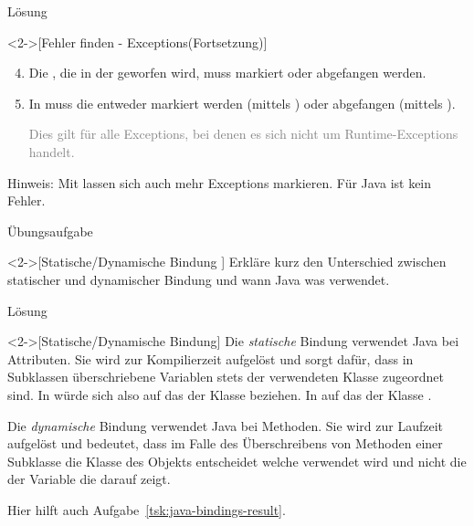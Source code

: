 \begin{frame}[c]{Lösung}
    \addtocounter{solve}{-1}
    \begin{solve}<2->[Fehler finden - Exceptions\hfill(Fortsetzung)]
        \begin{enumerate}[<+(1)->]
            \setcounter{enumi}{3}
            \item Die , die in der  geworfen wird, muss markiert oder abgefangen werden.
            \item In  muss die  entweder markiert werden (mittels ) oder abgefangen (mittels ).\pause\par \textcolor{gray}{Dies gilt für alle Exceptions, bei denen es sich nicht um Runtime-Exceptions handelt.}
        \end{enumerate}
        Hinweis: Mit  lassen sich auch mehr Exceptions markieren. Für Java ist  kein Fehler.
    \end{solve}
\end{frame}

\begin{frame}[c]{Übungsaufgabe}
    \begin{exercise}<2->[Statische/Dynamische Bindung ]
        Erkläre kurz den Unterschied zwischen statischer und dynamischer Bindung und wann Java was verwendet.
    \end{exercise}
\end{frame}

\begin{frame}[c]{Lösung}
    \begin{solve}<2->[Statische/Dynamische Bindung]
        Die \emph{statische} Bindung verwendet Java bei Attributen. Sie wird zur Kompilierzeit aufgelöst und sorgt dafür, dass in Subklassen überschriebene Variablen stets der verwendeten Klasse zugeordnet sind. In  würde sich  also auf das  der Klasse  beziehen. In  auf das der Klasse .\medskip\par
        \pause{}Die \emph{dynamische} Bindung verwendet Java bei Methoden. Sie wird zur Laufzeit aufgelöst und bedeutet, dass im Falle des Überschreibens von Methoden einer Subklasse die Klasse des Objekts entscheidet welche verwendet wird und nicht die der Variable die darauf zeigt.\pause\medskip\par
        Hier hilft auch Aufgabe~\ref{tsk:java-bindings-result}.
    \end{solve}
\end{frame}


